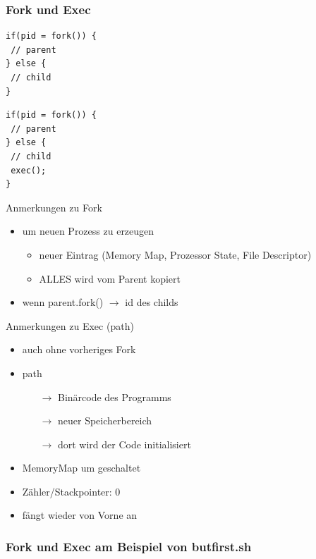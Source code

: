 
	\subsubsection*{Fork und Exec} %
	\label{ssub:aufruf_von_fork}
	
		\begin{lstlisting}
if(pid = fork()) {
 // parent
} else {
 // child
}
		\end{lstlisting}

		\begin{lstlisting}
if(pid = fork()) {
 // parent
} else {
 // child
 exec();
}
		\end{lstlisting}

	Anmerkungen zu Fork
		\begin{itemize}
			\item um neuen Prozess zu erzeugen
			\begin{itemize}
				\item neuer Eintrag (Memory Map, Prozessor State, File Descriptor)
				\item ALLES wird vom Parent kopiert
			\end{itemize}
				\item wenn parent.fork() $\rightarrow$ id des childs
		\end{itemize}
		
	Anmerkungen zu Exec (path)
		\begin{itemize}
			\item auch ohne vorheriges Fork
			\item path
			\begin{itemize}
				\item[$\rightarrow$] Binärcode des Programms
				\item[$\rightarrow$] neuer Speicherbereich
				\item[$\rightarrow$] dort wird der Code initialisiert
			\end{itemize}
				\item MemoryMap um geschaltet
				\item Zähler/Stackpointer: 0
				\item fängt wieder von Vorne an
		\end{itemize}

	\subsubsection*{Fork und Exec am Beispiel von butfirst.sh} %
	\label{ssub:fork_am_beispiel_von_butfirst_sh}
	
